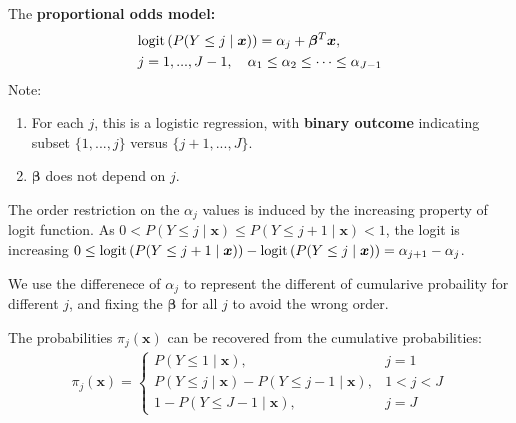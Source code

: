 \documentclass[11pt]{elegantbook}
\begin{document}
\begin{definition}
    \normalfont
    The \textbf{proportional odds model:}
    \begin{equation}
        \begin{aligned}
            &\textnormal{logit}\left(P(Y\leq j\mid \boldsymbol{x})\right)=\alpha_j+\boldsymbol{\beta}^T \boldsymbol{x},\\
            &j=1,...,J-1,\quad \alpha_1\leq\alpha_2\leq\cdots\leq\alpha_{J-1}
        \end{aligned}
        \nonumber
    \end{equation}
    Note:
    \begin{enumerate}[$\bullet$]
        \item For each $j$, this is a logistic regression, with \textbf{binary outcome} indicating subset $\{1, . . . , j\}$ versus $\{j + 1, . . . , J\}$.
        \item $\boldsymbol{\beta}$ does not depend on $j$.
    \end{enumerate}
\end{definition}
The order restriction on the $\alpha_j$ values is induced by the increasing property of logit function. As $0<P(Y\leq j\mid \boldsymbol{x})\leq P(Y\leq j+1\mid \boldsymbol{x})<1$, the logit is increasing $0\leq \textnormal{logit}\left(P(Y\leq j+1\mid \boldsymbol{x})\right)-\textnormal{logit}\left(P(Y\leq j\mid \boldsymbol{x})\right)=\alpha_{j+1}-\alpha_j$.

We use the differenece of $\alpha_j$ to represent the different of cumularive probaility for different $j$, and fixing the $\boldsymbol{\beta}$ for all $j$ to avoid the wrong order.

The probabilities $\pi_j(\boldsymbol{x})$ can be recovered from the cumulative probabilities:
\begin{equation}
    \begin{aligned}
        \pi_j(\boldsymbol{x})=\left\{\begin{matrix}
            P(Y\leq 1\mid \boldsymbol{x}),&j=1\\
            P(Y\leq j\mid \boldsymbol{x})-P(Y\leq j-1\mid \boldsymbol{x}),&1<j<J\\
            1-P(Y\leq J-1\mid \boldsymbol{x}),&j=J
        \end{matrix}\right.
    \end{aligned}
    \nonumber
\end{equation}
\end{document}
